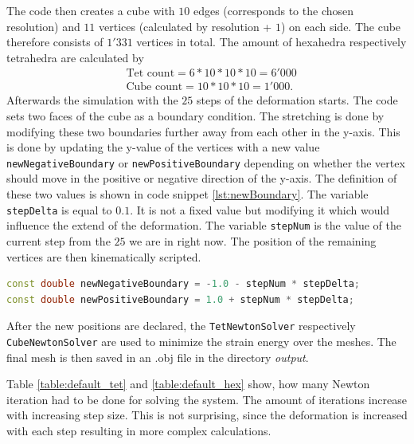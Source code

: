 The code then creates a cube with $10$ edges (corresponds to the chosen resolution) and $11$ vertices (calculated by resolution + $1$) on each side. The cube therefore consists of $1'331$ vertices in total. The amount of hexahedra respectively tetrahedra are calculated by
\begin{align*}
	&\text{Tet count} = 6 * 10 * 10 * 10 = 6'000 \\
	&\text{Cube count} = 10 * 10 * 10 = 1'000.
\end{align*}
Afterwards the simulation with the $25$ steps of the deformation starts. The code sets two faces of the cube as a boundary condition. The stretching is done by modifying these two boundaries further away from each other in the y-axis. This is done by updating the y-value of the vertices with a new value \verb|newNegativeBoundary| or \verb|newPositiveBoundary| depending on whether the vertex should move in the positive or negative direction of the y-axis. The definition of these two values is shown in code snippet \ref{lst:newBoundary}. The variable \verb|stepDelta| is equal to $0.1$. It is not a fixed value but modifying it which would influence the extend of the deformation. The variable \verb|stepNum| is the value of the current step from the $25$ we are in right now. The position of the remaining vertices are then kinematically scripted.
\newline
\begin{lstlisting}[language=C++, numbers=none, label=lst:newBoundary, caption=Updating y-coordinates of vertices, captionpos=b]
const double newNegativeBoundary = -1.0 - stepNum * stepDelta;
const double newPositiveBoundary = 1.0 + stepNum * stepDelta;
\end{lstlisting}

After the new positions are declared, the \verb|TetNewtonSolver| respectively \verb|CubeNewtonSolver| are used to minimize the strain energy over the meshes. The final mesh is then saved in an .obj file in the directory \textit{output}. 

Table \ref{table:default_tet} and \ref{table:default_hex} show, how many Newton iteration had to be done for solving the system. The amount of iterations increase with increasing step size. This is not surprising, since the deformation is increased with each step resulting in more complex calculations.

